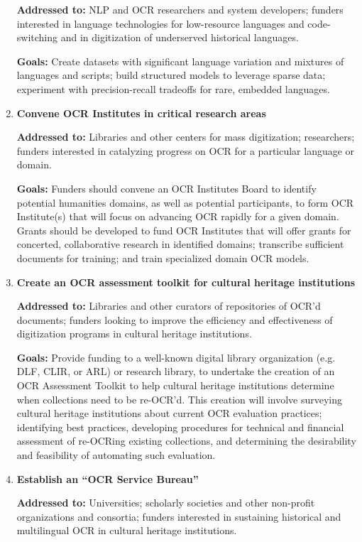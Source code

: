 \documentclass[twoside,11pt]{report}
\begin{document}
\begin{enumerate}
\textbf{Addressed to:} NLP and OCR researchers and system developers; funders interested in language technologies for low-resource languages and code-switching and in digitization of underserved historical languages.

\textbf{Goals:} Create datasets with significant language variation and mixtures of languages and scripts; build structured models to leverage sparse data; experiment with precision-recall tradeoffs for rare, embedded languages.

\item \textbf{Convene OCR Institutes in critical research areas}

\textbf{Addressed to:} Libraries and other centers for mass digitization; researchers; funders interested in catalyzing progress on OCR for a particular language or domain.

\textbf{Goals:} Funders should convene an OCR Institutes Board to identify potential humanities domains, as well as potential participants, to form OCR Institute(s) that will focus on advancing OCR rapidly for a given domain. Grants should be developed to fund OCR Institutes that will offer grants for concerted, collaborative research in identified domains; transcribe sufficient documents for training; and train specialized domain OCR models.

\item \textbf{Create an OCR assessment toolkit for cultural heritage institutions}

\textbf{Addressed to:} Libraries and other curators of repositories of OCR'd documents; funders looking to improve the efficiency and effectiveness of digitization programs in cultural heritage institutions.

\textbf{Goals:} Provide funding to a well-known digital library organization (e.g. DLF, CLIR, or ARL) or research library, to undertake the creation of an OCR Assessment Toolkit to help cultural heritage institutions determine when collections need to be re-OCR'd. This creation will involve surveying cultural heritage institutions about current OCR evaluation practices; identifying best practices, developing procedures for technical and financial assessment of re-OCRing existing collections, and determining the desirability and feasibility of automating such evaluation.

\item \textbf{Establish an ``OCR Service Bureau''}

\textbf{Addressed to:} Universities; scholarly societies and other non-profit organizations and consortia; funders interested in sustaining historical and multilingual OCR in cultural heritage institutions.


\end{enumerate}
\end{document}

